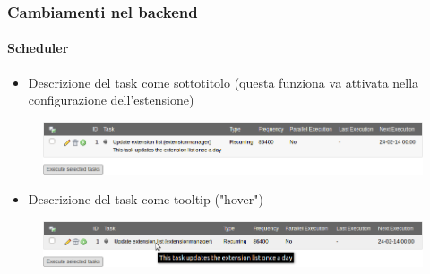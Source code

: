 
\begin{frame}[fragile]
	\frametitle{Cambiamenti nel backend}
	\framesubtitle{Scheduler}

	\begin{itemize}
		\item Descrizione del task come sottotitolo\newline
			\small(questa funziona va attivata nella configurazione dell'estensione)\normalsize
	\end{itemize}

	\begin{figure}
		\includegraphics[width=0.95\linewidth]{Images/BackendChanges/SchedulerTaskDescriptionAsSubheader.png}
	\end{figure}

	\begin{itemize}
		\item Descrizione del task come tooltip ("hover")
	\end{itemize}

	\begin{figure}
		\includegraphics[width=0.95\linewidth]{Images/BackendChanges/SchedulerTaskDescriptionAsTooltip.png}
	\end{figure}

\end{frame}



